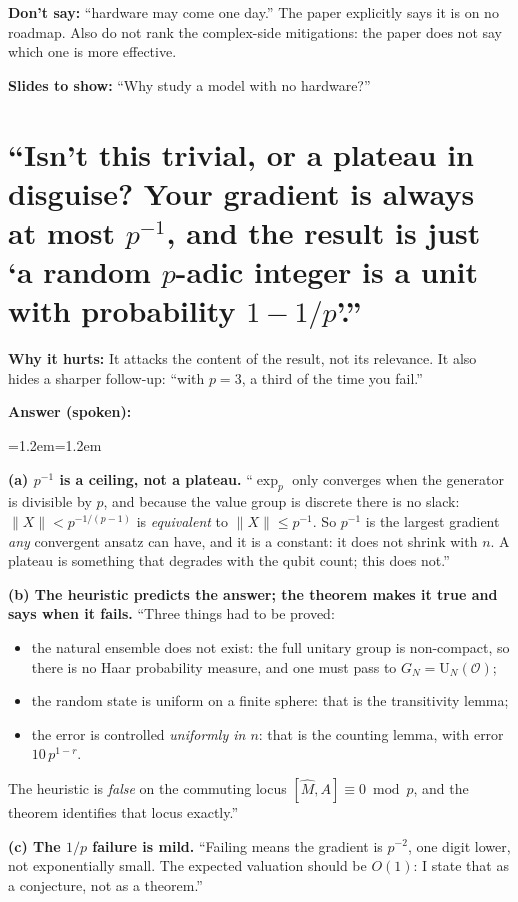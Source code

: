 \documentclass[11pt,a4paper]{article}
\newcommand{\OK}{\mathcal{O}}
\newenvironment{answer}
  {\par\noindent\textbf{\color{navy}Answer (spoken):}\par
   \begin{list}{}{\leftmargin=1.2em\rightmargin=1.2em}\item\relax}
  {\end{list}}
\newcommand{\avoid}[1]{\par\noindent\textbf{\color{BrickRed}Don't say:} #1\par}
\newcommand{\slides}[1]{\par\noindent\textbf{\color{ForestGreen}Slides to show:} #1\par}
\newcommand{\why}[1]{\par\noindent\textbf{Why it hurts:} #1\par}
\begin{document}
\avoid{``hardware may come one day.'' The paper explicitly says it is on no
roadmap. Also do not rank the complex-side mitigations: the paper does not say
which one is more effective.}

\slides{``Why study a model with no hardware?''}

\section{``Isn't this trivial, or a plateau in disguise? Your gradient is always at most $p^{-1}$, and the result is just `a random $p$-adic integer is a unit with probability $1-1/p$'.''}

\why{It attacks the content of the result, not its relevance. It also hides a
sharper follow-up: ``with $p=3$, a third of the time you fail.''}

\begin{answer}
\textbf{(a) $p^{-1}$ is a ceiling, not a plateau.} ``$\exp_p$ only converges
when the generator is divisible by $p$, and because the value group is
discrete there is no slack: $\|X\|<p^{-1/(p-1)}$ is \emph{equivalent} to
$\|X\|\le p^{-1}$. So $p^{-1}$ is the largest gradient \emph{any} convergent
ansatz can have, and it is a constant: it does not shrink with $n$. A plateau
is something that degrades with the qubit count; this does not.''

\textbf{(b) The heuristic predicts the answer; the theorem makes it true and
says when it fails.} ``Three things had to be proved:
\begin{itemize}
  \item the natural ensemble does not exist: the full unitary group is
    non-compact, so there is no Haar probability measure, and one must pass
    to $G_N=\mathrm{U}_N(\OK)$;
  \item the random state is uniform on a finite sphere: that is the
    transitivity lemma;
  \item the error is controlled \emph{uniformly in $n$}: that is the counting
    lemma, with error $10\,p^{1-r}$.
\end{itemize}
The heuristic is \emph{false} on the commuting locus
$[\widehat M,A]\equiv0 \bmod p$, and the theorem identifies that locus
exactly.''

\textbf{(c) The $1/p$ failure is mild.} ``Failing means the gradient is
$p^{-2}$, one digit lower, not exponentially small. The expected valuation
should be $O(1)$: I state that as a conjecture, not as a theorem.''
\end{answer}
\end{document}
